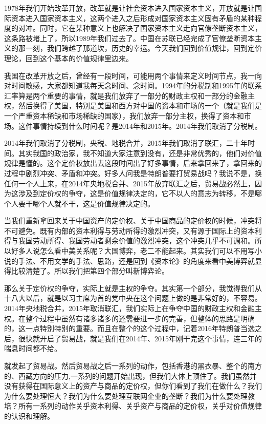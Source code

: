 \documentclass[UTF8, 12pt, a4paper]{ctexrep}
\begin{document}
1978年我们开始改革开放，改革就是让社会资本进入国家资本主义，开放就是让国际资本进入国家资本主义，这两个进入之后形成对国家资本主义固有矛盾的某种程度的对冲。同时，它在某种意义上也解决了国家资本主义走向官僚垄断资本主义，这条路被堵上了，所以1989年我们过去了。中国在苏联已经完成了官僚垄断资本主义的那一刻，我们跨越了那道坎，历史的幸运。今天我们回到价值规律，回到定价理论，回到这个基本的价值规律里边来。

我国在改革开放之后，曾经有一段时间，可能用两个事情来定义时间节点，我一向对时间敏感，大家都知道我每天念时间、念时间。1994年的分税制和1995年的联系汇率算是两个重要的事情，就是我们放弃了一部分的财政主权和一部分的金融主权，然后换得了美国，特别是美国和西方对中国的资本和市场的一个（就是我们是一个严重资本稀缺和市场稀缺的国家），我们放弃一部分主权，换得了资本和市场。这件事情持续到什么时间呢？是2014年和2015年。2014年我们取消了分税制。

2014年我们取消了分税制，央税、地税合并，2015年我们取消了联汇，二十年时间。其实我国的政治家，我不知道大家注意到没有，还是非常优秀的，他们对价值规律是懂的。这个定价权放出去这段时间出了好多事情，后来拿回来了，拿回来的过程中剧烈冲突、矛盾和冲突。好多人问我是特朗普要打贸易战吗？我说不是，换任何一个人上来，在2014年央地税合并、2015年放弃联汇之后，贸易战必然上，因为这涉及到定价权的争夺，这是价值规律决定的，它不以人的意志为转移，不是哪个人要干哪个人就不干，这是价值规律决定的。

当我们重新拿回来关于中国资产的定价权、关于中国商品的定价权的时候，冲突将不可避免。既有内部的资本利得与劳动所得的激烈冲突，又有源于国际上的资本利得与我国劳动所得、我国劳动者剩余价值的激烈冲突，这个冲突几乎不可调和。所以好多人说怎么看中美关系呢？大国博弈，老二不能起来。其实我们可以不用写小说的手法、不用文学的手法、思路，还是回到《资本论》的角度来看中美博弈就显得比较清楚了。所以我们把第四个部分叫新博弈论。

那么关于定价权的争夺，实际上就是主权的争夺。其实第一个部分，我觉得我们从十八大以后，就是以习主席为首的党中央在这个问题上做的是非常好的，不容易。2014年央地税合并，2015年取消联汇，我们实际上在争夺中国的财政主权和金融主权。在整个过程中虽然有诸多诸多的还需要进一步的完善，但整体的思路是明确的，这一点特别特别的重要。而且在整个的这个过程中，记着2016年特朗普当选之后，很快就开启了贸易战，就是我们在2014年、2015年刚干完这个事情，连三年的喘息时间都不给。

就发起了贸易战。然后贸易战之后一系列的动作，包括香港的黑衣暴、整个的南方的、西藏方向的压力,一系列的问题开始出现，但我们大体上顶住了。我们虽然并没有获得在国际意义上的资产与商品的定价权，但你们看到了我们在做什么？我们为什么要处理恒大？我们为什么要处理互联网企业的垄断？我们为什么要处理教培？所有一系列的动作关乎资本利得、关乎资产与商品的定价权，关乎对价值规律的认识和理解。
\end{document}
